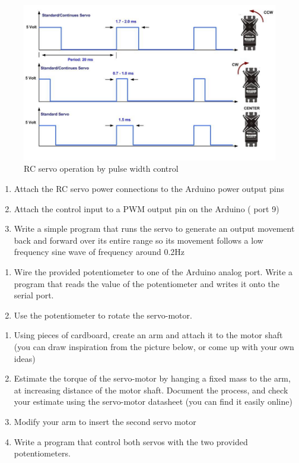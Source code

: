 \documentclass{instructions}
\begin{document}
\begin{figure}[h!]
    \centering
    \includegraphics[width=0.9\linewidth]{figs/servo-pwm}
    \caption{RC servo operation by pulse width control}
    \label{pwm}
\end{figure}


\begin{enumerate}
\item Attach the RC servo power connections to the Arduino power output pins
\item Attach the control input to a PWM output pin on the Arduino (\eg
  port 9)
\item Write a simple program that runs the servo to generate an output
  movement back and forward over its entire range so its movement
  follows a low frequency sine wave of frequency around 0.2Hz

\end{enumerate}


\begin{enumerate}
    \item Wire the provided potentiometer to one of the Arduino analog port.
        Write a program that reads the value of the potentiometer and writes it
        onto the serial port.
    \item Use the potentiometer to rotate the servo-motor.
\end{enumerate}


\begin{enumerate}
    \item Using pieces of cardboard, create an arm and attach it to the motor
        shaft (you can draw inspiration from the picture below, or come up with
        your own ideas)
    \item Estimate the torque of the servo-motor by hanging a fixed mass to the
        arm, at increasing distance of the motor shaft. Document the process,
        and check your estimate using the servo-motor datasheet (you can find it
        easily online)
    \item Modify your arm to insert the second servo motor
    \item Write a program that control both servos with the two provided
        potentiometers.
\end{enumerate}
\end{document}
